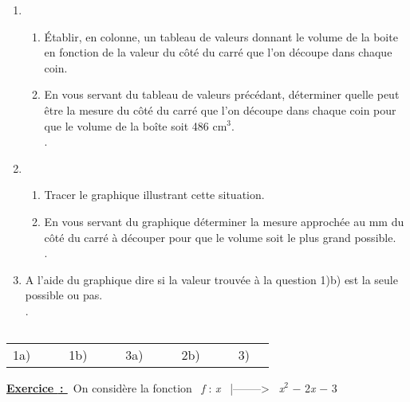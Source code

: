 \documentclass[12pt,a4paper]{article}
\newcounter {exercice}
\newcommand{\exdeb}{\vspace{18pt} \par \noindent \stepcounter{exercice} \textbf{\underline{{Exercice }\theexercice\,: }}\vspace{3 pt}}
\begin{document}
\begin{enumerate}[1{)}]
\item
\begin{enumerate}[a{)}]
\item
Établir, en colonne, un tableau de valeurs donnant le volume de la boite en fonction de la valeur du côté du carré que l'on découpe dans chaque coin.
\item
En vous servant du tableau de valeurs précédant, déterminer quelle peut être la mesure du côté du carré que l'on découpe dans chaque coin pour que le volume de la boîte soit 486 cm$^3$. \vspace{9pt} \\
.\dotfill \vspace{6pt}
\end{enumerate}
\item
\begin{enumerate}[a{)}]
\item
Tracer le graphique illustrant cette situation.
\item
En vous servant du graphique déterminer la mesure approchée au mm du côté du carré à découper pour que le volume soit le plus grand possible.\vspace{9pt} \\
.\dotfill \vspace{6pt}
\end{enumerate}
\item
A l'aide du graphique dire si la valeur trouvée à la question 1)b) est la seule possible ou pas.\vspace{9pt} \\
.\dotfill
\end{enumerate} 
$\ $ \\
\renewcommand{\arraystretch}{2}
\begin{tabular}{l|p{5mm}|p{0.5cm}l|p{5mm}|p{0.5cm}l|p{5mm}|p{0.5cm}l|p{5mm}|p{0.5cm}l|p{5mm}|}
\cline{2-2} \cline{5-5} \cline{8-8} \cline{11-11} \cline{14-14}
1a)&&&1b)&&&3a)&&&2b)&&&3)&\\
\cline{2-2} \cline{5-5} \cline{8-8} \cline{11-11} \cline{14-14}
\end{tabular} 
\exdeb \, On considère la fonction \, \textit{f} : \textit{x} \, |--------> \, \textit{x}$^2$ $-$ 2\textit{x} $-$ 3
\end{document}
